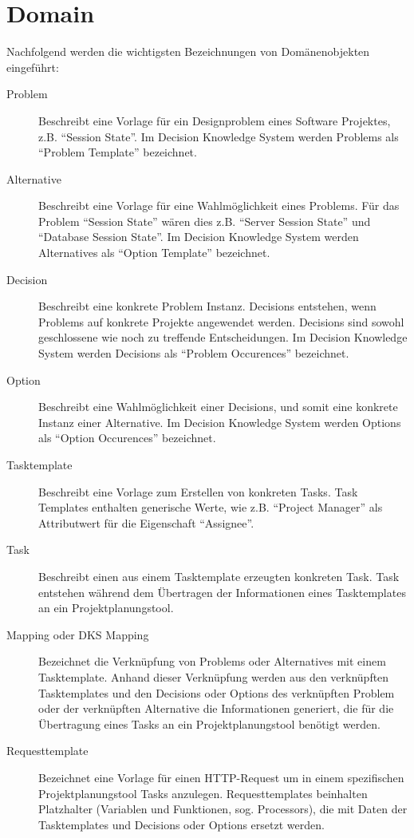 	\section{Domain}
		Nachfolgend werden die wichtigsten Bezeichnungen von Domänenobjekten eingeführt:
		
		\begin{description}
			\item[Problem] Beschreibt eine Vorlage für ein Designproblem eines Software Projektes, 
				z.B. ``Session State''. 
				Im Decision Knowledge System werden Problems als ``Problem Template'' bezeichnet.
			\item[Alternative] Beschreibt eine Vorlage für eine Wahlmöglichkeit eines Problems.
				Für das Problem ``Session State'' wären dies z.B. ``Server Session State'' und
				``Database Session State''. 
				Im Decision Knowledge System werden Alternatives als ``Option Template'' bezeichnet.
			\item[Decision] Beschreibt eine konkrete Problem Instanz.
				Decisions entstehen, wenn Problems auf konkrete Projekte angewendet werden.
				Decisions sind sowohl geschlossene wie noch zu treffende Entscheidungen.
				Im Decision Knowledge System werden Decisions als ``Problem Occurences'' bezeichnet.
			\item[Option] Beschreibt eine Wahlmöglichkeit einer Decisions, 
				und somit eine konkrete Instanz einer Alternative.
				Im Decision Knowledge System werden Options als ``Option Occurences'' bezeichnet.
			\item[Tasktemplate] Beschreibt eine Vorlage zum Erstellen von konkreten Tasks.
				Task Templates enthalten generische Werte, wie z.B. ``Project Manager'' als
				Attributwert für die Eigenschaft ``Assignee''.
			\item[Task] Beschreibt einen aus einem Tasktemplate erzeugten konkreten Task.
				Task entstehen während dem Übertragen der Informationen eines Tasktemplates an ein Projektplanungstool.
			\item[Mapping oder DKS Mapping] Bezeichnet die Verknüpfung von Problems oder 
				Alternatives mit einem Tasktemplate. 
				Anhand dieser Verknüpfung werden aus den verknüpften Tasktemplates und den Decisions oder Options des verknüpften Problem oder
				der verknüpften Alternative die Informationen generiert, 
				die für die Übertragung eines Tasks an ein Projektplanungstool benötigt werden.
			\item[Requesttemplate] Bezeichnet eine Vorlage für einen HTTP-Request um 
				in einem spezifischen Projektplanungstool Tasks anzulegen.
				Requesttemplates beinhalten Platzhalter (Variablen und Funktionen, sog. Processors),
				die mit Daten der Tasktemplates und Decisions oder Options ersetzt werden. 
		\end{description}	
	
